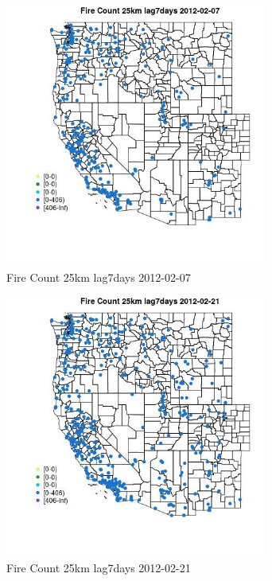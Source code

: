 \begin{figure} 
\centering  
\includegraphics[width=0.77\textwidth]{Code_Outputs/Report_ML_input_PM25_Step4_part_f_de_duplicated_aves_prioritize_24hr_obswNAs_MapObsFire_Count_25km_lag7days2012-02-07.jpg} 
\caption{\label{fig:Report_ML_input_PM25_Step4_part_f_de_duplicated_aves_prioritize_24hr_obswNAsMapObsFire_Count_25km_lag7days2012-02-07}Fire Count 25km lag7days 2012-02-07} 
\end{figure} 
 

\begin{figure} 
\centering  
\includegraphics[width=0.77\textwidth]{Code_Outputs/Report_ML_input_PM25_Step4_part_f_de_duplicated_aves_prioritize_24hr_obswNAs_MapObsFire_Count_25km_lag7days2012-02-21.jpg} 
\caption{\label{fig:Report_ML_input_PM25_Step4_part_f_de_duplicated_aves_prioritize_24hr_obswNAsMapObsFire_Count_25km_lag7days2012-02-21}Fire Count 25km lag7days 2012-02-21} 
\end{figure} 
 

